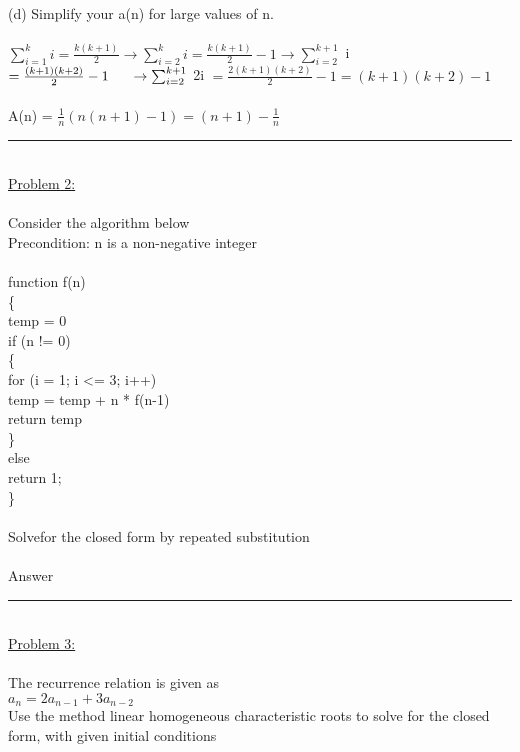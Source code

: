 \documentclass{article}
\begin{document}
    (d) Simplify your a(n) for large values of n.\\
    \\
    \indent $\sum_{i = 1}^{k} i = \frac{k(k+1)}{2} \rightarrow \sum_{i = 2}^{k} i = \frac{k(k+1)}{2} - 1 \rightarrow \sum_{i = 2}^{k+1}$ i $= \frac{(k+1)(k+2)}{2} - 1 \\\\\indent \rightarrow \sum_{i = 2}^{k+1}$ 2i $= \frac{2(k+1)(k+2)}{2} - 1 = (k+1)(k+2) - 1$\\
    \\
    \indent A(n) = $\frac{1}{n}(n(n+1) - 1) = (n+1) - \frac{1}{n}$\\
    \rule{\textwidth}{0.5pt}\\
    \underline{Problem 2:}\\\\
    Consider the algorithm below\\Precondition: n is a non-negative integer\\
    \\
    function f(n)\\
    \{\\
    \indent temp = 0\\
    \indent if (n != 0)\\
    \indent \{\\
    \indent \indent for (i = 1; i <= 3; i++)\\
    \indent \indent \indent temp = temp + n * f(n-1)\\
    \indent \indent return temp\\
    \indent \}\\
    \indent else\\
    \indent \indent return 1;\\
    \}\\
    \\
    Solvefor the closed form by repeated substitution\\
    \\
    \indent Answer
    \\
    \rule{\textwidth}{0.5pt}\\
    \underline{Problem 3:}\\\\
    The recurrence relation is given as \\
    \indent $a_n = 2a_{n-1} + 3a_{n-2}$\\
    Use the method linear homogeneous characteristic roots to solve for the closed form, with given initial conditions\\
\end{document}
